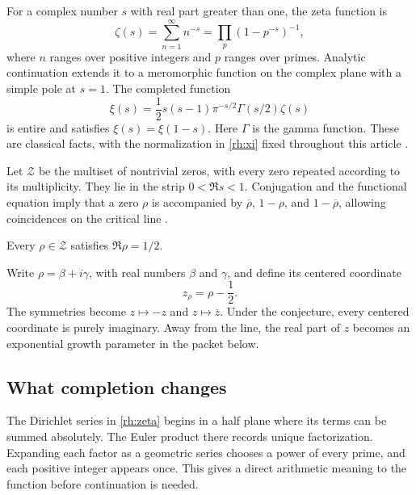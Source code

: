 For a complex number \(s\) with real part greater than one, the zeta function is
\begin{equation}\label{rh:zeta}
\zeta(s)=\sum_{n=1}^{\infty}n^{-s}
=\prod_{p}(1-p^{-s})^{-1},
\end{equation}
where \(n\) ranges over positive integers and \(p\) ranges over primes. Analytic continuation extends it to a meromorphic function on the complex plane with a simple pole at \(s=1\). The completed function
\begin{equation}\label{rh:xi}
\xi(s)=\frac12s(s-1)\pi^{-s/2}\Gamma(s/2)\zeta(s)
\end{equation}
is entire and satisfies \(\xi(s)=\xi(1-s)\). Here \(\Gamma\) is the gamma function. These are classical facts, with the normalization in \eqref{rh:xi} fixed throughout this article \cite{DLMFZeta}.

Let \(\mathcal Z\) be the multiset of nontrivial zeros, with every zero repeated according to its multiplicity. They lie in the strip \(0<\Re s<1\). Conjugation and the functional equation imply that a zero \(\rho\) is accompanied by \(\overline\rho\), \(1-\rho\), and \(1-\overline\rho\), allowing coincidences on the critical line \cite{DLMFZeros}.

\begin{conjecture}\label{rh:conjecture}
Every \(\rho\in\mathcal Z\) satisfies \(\Re\rho=1/2\).
\end{conjecture}

Write \(\rho=\beta+i\gamma\), with real numbers \(\beta\) and \(\gamma\), and define its centered coordinate
\begin{equation}\label{rh:centered}
z_\rho=\rho-\frac12.
\end{equation}
The symmetries become \(z\mapsto-z\) and \(z\mapsto\overline z\). Under the conjecture, every centered coordinate is purely imaginary. Away from the line, the real part of \(z\) becomes an exponential growth parameter in the packet below.

\subsection{What completion changes}

The Dirichlet series in \eqref{rh:zeta} begins in a half plane where its terms can be summed absolutely. The Euler product there records unique factorization. Expanding each factor as a geometric series chooses a power of every prime, and each positive integer appears once. This gives a direct arithmetic meaning to the function before continuation is needed.


